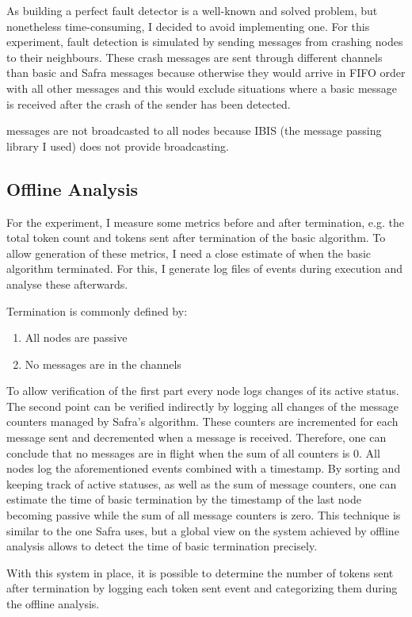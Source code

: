 As building a perfect fault detector is a well-known and solved problem, but nonetheless time-consuming, I decided to avoid implementing one.
For this experiment, fault detection is simulated by sending  messages from crashing nodes to their neighbours.
These crash messages are sent through different channels than basic and Safra messages because otherwise they would arrive in FIFO order with all other messages and this would exclude situations where a basic message is received after the crash of the sender has been detected.

 messages are not broadcasted to all nodes because IBIS (the message passing library I used) does not provide broadcasting.

\subsection{Offline Analysis}
\label{ssec:offline-analysis}
For the experiment, I measure some metrics before and after termination, e.g. the total token count and tokens sent after termination of the basic algorithm.
To allow generation of these metrics, I need a close estimate of when the basic algorithm terminated.
For this, I generate log files of events during execution and analyse these afterwards.

Termination is commonly defined by:
\begin{enumerate}
    \item All nodes are passive
    \item No messages are in the channels
\end{enumerate}
To allow verification of the first part every node logs changes of its active status.
The second point can be verified indirectly by logging all changes of the message counters managed by Safra's algorithm.
These counters are incremented for each message sent and decremented when a message is received.
Therefore, one can conclude that no messages are in flight when the sum of all counters is 0.
All nodes log the aforementioned events combined with a timestamp.
By sorting and keeping track of active statuses, as well as the sum of message counters, one can estimate the time of basic termination by the timestamp of the last node becoming passive while the sum of all message counters is zero.
This technique is similar to the one Safra uses, but a global view on the system achieved by offline analysis allows to detect the time of basic termination precisely.

With this system in place, it is possible to determine the number of tokens sent after termination by logging each token sent event and categorizing them during the offline analysis.

